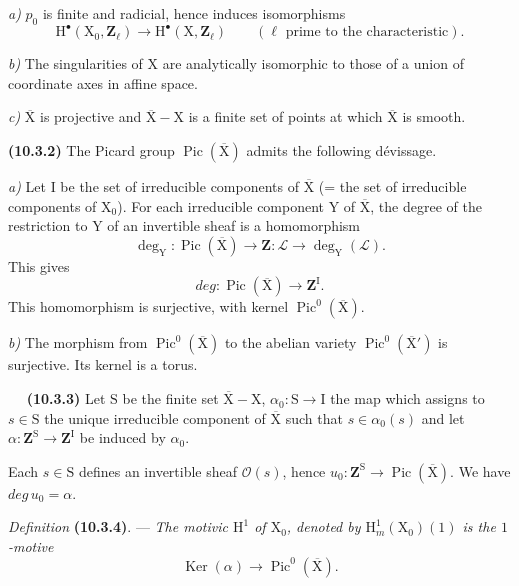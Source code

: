 \documentclass[11pt,leqno]{article}
\newcommand{\Page}[1]{\ifvmode\noindent\else\unskip\ \fi{\footnotesize\textcolor{gray}{[p.\,#1]}}\ \ignorespaces}
\begin{document}
\textit{a)} \(p_0\) is finite and radicial, hence induces isomorphisms
\[
\mathrm{H}^{\bullet}(\mathrm{X}_0,\mathbf{Z}_{\ell})
\longrightarrow
\mathrm{H}^{\bullet}(\mathrm{X},\mathbf{Z}_{\ell})
\qquad
(\ell\text{ prime to the characteristic}).
\]

\textit{b)} The singularities of \(\mathrm{X}\) are analytically isomorphic to those of a union of coordinate axes in affine space.

\textit{c)} \(\overline{\mathrm{X}}\) is projective and \(\overline{\mathrm{X}}-\mathrm{X}\) is a finite set of points at which \(\overline{\mathrm{X}}\) is smooth.

\textbf{(10.3.2)} The Picard group \(\operatorname{Pic}(\overline{\mathrm{X}})\) admits the following dévissage.

\textit{a)} Let \(\mathrm{I}\) be the set of irreducible components of \(\overline{\mathrm{X}}\) (= the set of irreducible components of \(\mathrm{X}_0\)). For each irreducible component \(\mathrm{Y}\) of \(\overline{\mathrm{X}}\), the degree of the restriction to \(\mathrm{Y}\) of an invertible sheaf is a homomorphism
\[
\deg_{\mathrm{Y}}:\operatorname{Pic}(\overline{\mathrm{X}})
\longrightarrow\mathbf{Z}:
\mathcal{L}\longrightarrow\deg_{\mathrm{Y}}(\mathcal{L}).
\]
This gives
\[
\mathit{deg}:\operatorname{Pic}(\overline{\mathrm{X}})
\longrightarrow\mathbf{Z}^{\mathrm{I}}.
\]
This homomorphism is surjective, with kernel \(\operatorname{Pic}^{0}(\overline{\mathrm{X}})\).

\textit{b)} The morphism from \(\operatorname{Pic}^{0}(\overline{\mathrm{X}})\) to the abelian variety \(\operatorname{Pic}^{0}(\overline{\mathrm{X}}')\) is surjective. Its kernel is a torus.

\Page{70}
\textbf{(10.3.3)} Let \(\mathrm{S}\) be the finite set \(\overline{\mathrm{X}}-\mathrm{X}\), \(\alpha_0:\mathrm{S}\to\mathrm{I}\) the map which assigns to \(s\in\mathrm{S}\) the unique irreducible component of \(\overline{\mathrm{X}}\) such that \(s\in\alpha_0(s)\) and let \(\alpha:\mathbf{Z}^{\mathrm{S}}\to\mathbf{Z}^{\mathrm{I}}\) be induced by \(\alpha_0\).

Each \(s\in\mathrm{S}\) defines an invertible sheaf \(\mathcal{O}(s)\), hence \(u_0:\mathbf{Z}^{\mathrm{S}}\to\operatorname{Pic}(\overline{\mathrm{X}})\). We have \(\mathit{deg}\,u_0=\alpha\).

\textit{Definition} \textbf{(10.3.4)}. — \textit{The \textup{motivic} \(\mathrm{H}^{1}\) of \(\mathrm{X}_0\), denoted by \(\mathrm{H}^{1}_{m}(\mathrm{X}_0)(1)\) is the \(1\)-motive}
\[
\operatorname{Ker}(\alpha)\longrightarrow
\operatorname{Pic}^{0}(\overline{\mathrm{X}}).
\]
\end{document}
